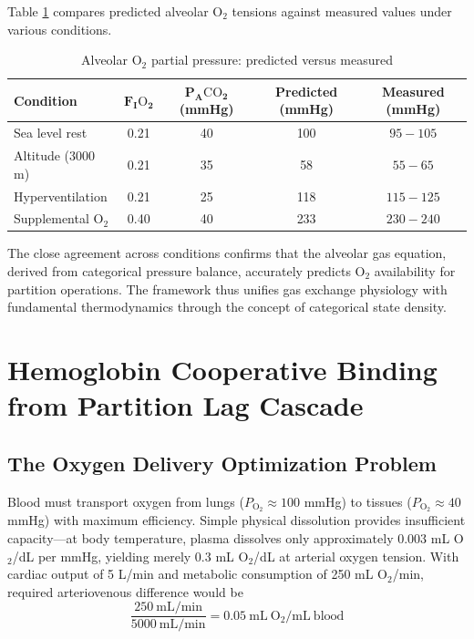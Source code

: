 \documentclass[10pt,twocolumn,a4paper]{article}
\theoremstyle{remark}
\begin{document}
Table \ref{tab:alveolar_gas_validation} compares predicted alveolar O$_{2}$ tensions against measured values under various conditions.

\begin{table}[h]
\centering
\caption{Alveolar O$_{2}$ partial pressure: predicted versus measured}
\label{tab:alveolar_gas_validation}
\begin{tabular}{lcccc}
\toprule
\textbf{Condition} & $\boldsymbol{F_{I}\mathrm{O}_{2}}$ & $\boldsymbol{P_{A}\mathrm{CO}_{2}}$ (mmHg) & \textbf{Predicted} (mmHg) & \textbf{Measured} (mmHg) \\
\midrule
Sea level rest & 0.21 & 40 & 100 & $95-105$ \\
Altitude (3000 m) & 0.21 & 35 & 58 & $55-65$ \\
Hyperventilation & 0.21 & 25 & 118 & $115-125$ \\
Supplemental O$_{2}$ & 0.40 & 40 & 233 & $230-240$ \\
\bottomrule
\end{tabular}
\end{table}

The close agreement across conditions confirms that the alveolar gas equation, derived from categorical pressure balance, accurately predicts O$_{2}$ availability for partition operations. The framework thus unifies gas exchange physiology with fundamental thermodynamics through the concept of categorical state density.

\section{Hemoglobin Cooperative Binding from Partition Lag Cascade}
\label{sec:hemoglobin}

\subsection{The Oxygen Delivery Optimization Problem}

Blood must transport oxygen from lungs ($P_{\mathrm{O}_{2}} \approx 100$ mmHg) to tissues ($P_{\mathrm{O}_{2}} \approx 40$ mmHg) with maximum efficiency. Simple physical dissolution provides insufficient capacity—at body temperature, plasma dissolves only approximately $0.003$ mL O$_{2}$/dL per mmHg, yielding merely $0.3$ mL O$_{2}$/dL at arterial oxygen tension. With cardiac output of 5 L/min and metabolic consumption of 250 mL O$_{2}$/min, required arteriovenous difference would be
\begin{equation}
\frac{250~\mathrm{mL/min}}{5000~\mathrm{mL/min}} = 0.05~\mathrm{mL~O}_{2}/\mathrm{mL~blood}
\end{equation}
\end{document}
